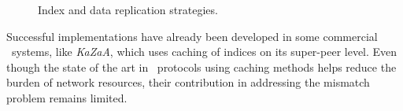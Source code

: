 \begin{figure}[ht]
\centering
{}\qquad\qquad
{}
\caption{Index and data replication strategies.}
\label{figure:replication}
\end{figure}
Successful implementations have
already been developed in some commercial \p\ systems, like 
\emph{KaZaA}, which uses
caching of indices on its super-peer level. 
Even though the state of the art in \p\ protocols using caching methods
helps reduce the burden of network resources, 
their contribution in addressing the mismatch problem 
remains limited.

